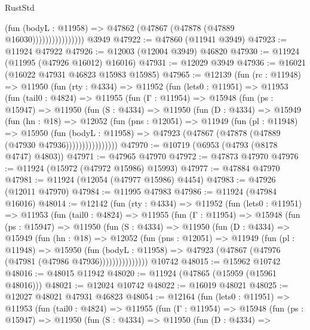 \begin{lexlean}{RustStd}
\begin{coremodule}
                            (fun (bodyL : @11958) =>
                            @47862 (@47867 (@47878 (@47889 @16030))))))))))))))))
    @3949
@47922 := @47860 (@11941 @3949)
@47923 := @11924 @47922
@47926 := @12003 (@12004 @3949) @46820
@47930 := @11924 (@11995 (@47926 @16012) @16016)
@47931 := @12029 @3949
@47936 := @16021 (@16022 @47931 @46823 @15983 @15985)
@47965 := @12139
    (fun (rc : @11948) =>
    @11950
      (fun (rty : @4334) =>
      @11952
        (fun (lets0 : @11951) =>
        @11953
          (fun (tail0 : @4824) =>
          @11955
            (fun (Γ : @11954) =>
            @15948
              (fun (ps : @15947) =>
              @11950
                (fun (S : @4334) =>
                @11950
                  (fun (D : @4334) =>
                  @15949
                    (fun (hn : @18) =>
                    @12052
                      (fun (pns : @12051) =>
                      @11949
                        (fun (pl : @11948) =>
                        @15950
                          (fun (bodyL : @11958) =>
                          @47923 (@47867 (@47878 (@47889 (@47930 @47936))))))))))))))))
@47970 := @10719 (@6953 (@4793 (@8178 @4747) @4803))
@47971 := @47965 @47970
@47972 := @47873 @47970
@47976 := @11924 (@15972 (@47972 @15986) @15993)
@47977 := @47884 @47970
@47981 := @11924 (@12054 (@47977 @15986) @4454)
@47983 := @47926 (@12011 @47970)
@47984 := @11995 @47983
@47986 := @11924 (@47984 @16016)
@48014 := @12142
    (fun (rty : @4334) =>
    @11952
      (fun (lets0 : @11951) =>
      @11953
        (fun (tail0 : @4824) =>
        @11955
          (fun (Γ : @11954) =>
          @15948
            (fun (ps : @15947) =>
            @11950
              (fun (S : @4334) =>
              @11950
                (fun (D : @4334) =>
                @15949
                  (fun (hn : @18) =>
                  @12052
                    (fun (pns : @12051) =>
                    @11949
                      (fun (pl : @11948) =>
                      @15950
                        (fun (bodyL : @11958) =>
                        @47923 (@47867 (@47976 (@47981 (@47986 @47936)))))))))))))))
    @10742
@48015 := @15962 @10742
@48016 := @48015 @11942
@48020 := @11924 (@47865 (@15959 (@15961 @48016)))
@48021 := @12024 @10742
@48022 := @16019 @48021
@48025 := @12027 @48021 @47931 @46823
@48054 := @12164
    (fun (lets0 : @11951) =>
    @11953
      (fun (tail0 : @4824) =>
      @11955
        (fun (Γ : @11954) =>
        @15948
          (fun (ps : @15947) =>
          @11950
            (fun (S : @4334) =>
            @11950
              (fun (D : @4334) =>

\end{coremodule}
\end{lexlean}
